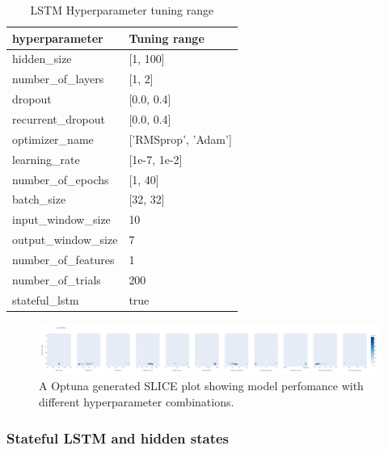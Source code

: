 \begin{table}[h]
  \centering
  \caption{LSTM Hyperparameter tuning range}
  \label{table:LSTM-hyperparameters-tuning-range}
  \begin{tabular}{|l|l|}\hline
    hyperparameter       & Tuning range        \\ \hline
    \hline
    hidden\_size         & [1, 100]            \\
    number\_of\_layers   & [1, 2]              \\
    dropout              & [0.0, 0.4]          \\
    recurrent\_dropout   & [0.0, 0.4]          \\
    optimizer\_name      & ['RMSprop', 'Adam'] \\
    learning\_rate       & [1e-7, 1e-2]        \\
    number\_of\_epochs   & [1, 40]             \\
    batch\_size          & [32, 32]            \\
    input\_window\_size  & 10                  \\
    output\_window\_size & 7                   \\
    number\_of\_features & 1                   \\
    number\_of\_trials   & 200                 \\
    stateful\_lstm       & true                \\
    \hline
  \end{tabular}
\end{table}
\begin{figure}[h!]
  \centering
  \includegraphics[width=\textwidth]{./figs/hyperparameter_plot_ranges_dataset2.png}
  \hfill
  \caption{A Optuna generated SLICE plot showing model perfomance with different hyperparameter combinations.}
  \label{fig:lstm:optuna-parameter-slice-figure}
\end{figure}

\subsubsection{Stateful LSTM and hidden states}
\label{section:Method:stateful-lstm-and-hidden-states}

